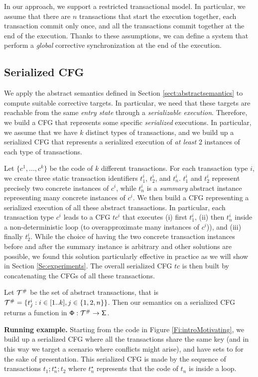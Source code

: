 In our approach, we support a restricted transactional model. In particular, we assume that there are $n$ transactions that start the execution together, each transaction commit only once, and all the transactions commit together at the end of the execution. Thanks to these assumptions, we can define a system that perform a \emph{global} corrective synchronization at the end of the execution.


\subsection{Serialized CFG}
\label{Se:concabs}
We apply the abstract semantics defined in Section \ref{sect:abstractsemantics} to compute suitable corrective targets. In particular, we need that these targets are reachable from the same \emph{entry state} through a \emph{serializable execution}. Therefore, we build a CFG that represents some specific \emph{serialized} executions. In particular, we assume that we have $k$ distinct types of transactions, and we build up a serialized CFG that represents a serialized execution of \emph{at least} 2 instances of each type of transactions.

Let $\{c^1, ..., c^k\}$ be the code of $k$ different transactions. For each transaction type $i$, we create three static transaction identifiers $t^i_1$, $t^i_2$, and $t^i_n$. $t^i_1$ and $t^i_2$ represent precisely two concrete instances of $c^i$, while $t^i_n$ is a \emph{summary} abstract instance representing many concrete instances of $c^i$. We then build a CFG representing a serialized execution of all these abstract transactions. In particular, each transaction type $c^i$ leads to a CFG $tc^i$ that executes (i) first $t^i_1$, (ii) then $t^i_n$ inside a non-deterministic loop (to overapproximate many instances of $c^i$)), and (iii) finally $t^i_2$. While the choice of having the two concrete transaction instances before and after the summary instance is arbitrary and other solutions are possible, we found this solution particularly effective in practice as we will show in Section \ref{Se:experiments}. The overall serialized CFG $tc$ is then built by concatenating the CFGs of all these transactions.

Let $\abstracttransactions$ be the set of abstract transactions, that is $\abstracttransactions = \{t^i_j : i \in [1..k], j \in \{1, 2, n\}\}$. Then our semantics on a serialized CFG returns a function in $\amultistate : \abstracttransactions \to \astate$.


\noindent \textbf{Running example.}
Starting from the code in Figure \ref{Fi:introMotivating}, we build up a serialized CFG where all the transactions share the same key  (and in this way we target a scenario where conflicts might arise), and have  sets to  for the sake of presentation. This serialized CFG is made by the sequence of transactions $t_1; t_n^\star; t_2$ where $t_n^\star$ represents that the code of $t_n$ is inside a loop.

